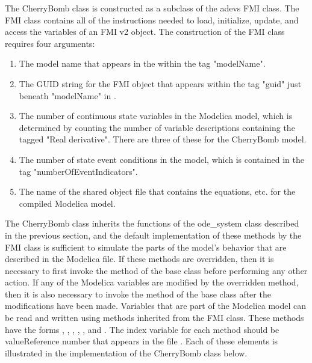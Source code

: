 The CherryBomb class is constructed as a subclass of the adevs FMI class. The FMI class contains all of the instructions needed to load, initialize, update, and access the variables of an FMI v2 object. The construction of the FMI class requires four arguments:
\begin{enumerate}
\item The model name that appears in the  within the tag "modelName".
\item The GUID string for the FMI object that appears within the tag "guid" just beneath "modelName" in .
\item The number of continuous state variables in the Modelica model, which is determined by counting the number of variable descriptions containing the tagged "Real derivative". There are three of these for the CherryBomb model.
\item The number of state event conditions in the model, which is contained in the tag "numberOfEventIndicators". 
\item The name of the shared object file that contains the equations, etc. for the compiled Modelica model.
\end{enumerate}
The CherryBomb class inherits the functions of the ode\_system class described in the previous section, and the default implementation of these methods by the FMI class is sufficient to simulate the parts of the model's behavior that are described in the Modelica file. If these methods are overridden, then it is necessary to first invoke the method of the base class before performing any other action. If any of the Modelica variables are modified by the overridden method, then it is also necessary to invoke the method of the base class after the modifications have been made. Variables that are part of the Modelica model can be read and written using methods inherited from the FMI class. These methods have the forms , , , , , and . The index variable for each method should be valueReference number that appears in the file . Each of these elements is illustrated in the implementation of the CherryBomb class below.

